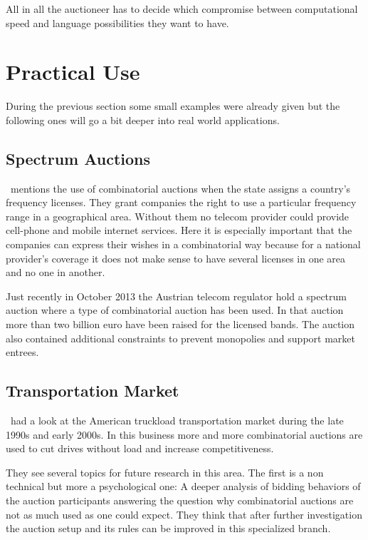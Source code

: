 \documentclass[a4paper]{paper}
\begin{document}
All in all the auctioneer has to decide which compromise between computational speed and language possibilities they want to have.

\section{Practical Use}

During the previous section some small examples were already given but the following ones will go a bit deeper into real world applications.

\subsection{Spectrum Auctions}
\cite[p.~269]{BN07}~mentions the use of combinatorial auctions when the state assigns a country's frequency licenses. They grant companies the right to use a particular frequency range in a geographical area. Without them no telecom provider could provide cell-phone and mobile internet services. Here it is especially important that the companies can express their wishes in a combinatorial way because for a national provider's coverage it does not make sense to have several licenses in one area and no one in another.

Just recently in October 2013 the Austrian telecom regulator hold a spectrum auction where a type of combinatorial auction has been used. In that auction more than two billion euro have been raised for the licensed bands. The auction also contained additional constraints to prevent monopolies and support market entrees.~\cite{RTR:Telecom}

\subsection{Transportation Market}
\cite{CELM07}~had a look at the American truckload transportation market during the late 1990s and early 2000s. In this business more and more combinatorial auctions are used to cut drives without load and increase competitiveness.

They see several topics for future research in this area. The first is a non technical but more a psychological one: A deeper analysis of bidding behaviors of the auction participants answering the question why combinatorial auctions are not as much used as one could expect. They think that after further investigation the auction setup and its rules can be improved in this specialized branch.
\end{document}
